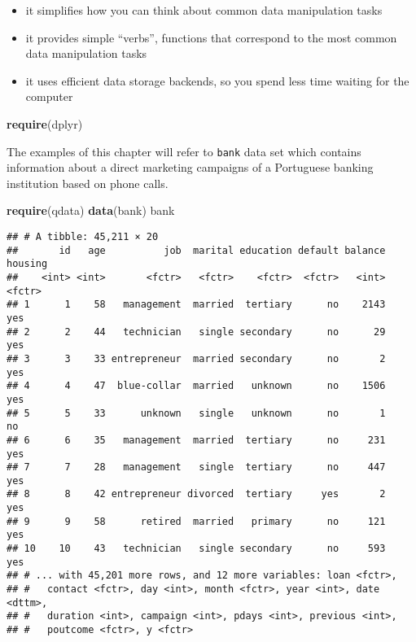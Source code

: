 \documentclass[]{book}
\newenvironment{Shaded}{\begin{snugshade}}{\end{snugshade}}
\newcommand{\KeywordTok}[1]{\textcolor[rgb]{0.13,0.29,0.53}{\textbf{{#1}}}}
\newcommand{\NormalTok}[1]{{#1}}
\providecommand{\tightlist}{%
  \setlength{\itemsep}{0pt}\setlength{\parskip}{0pt}}
\def\tightlist{}
\begin{document}
\begin{itemize}
\tightlist
\item
  it simplifies how you can think about common data manipulation tasks
\item
  it provides simple ``verbs'', functions that correspond to the most
  common data manipulation tasks
\item
  it uses efficient data storage backends, so you spend less time
  waiting for the computer
\end{itemize}

\begin{Shaded}
\begin{Highlighting}[]
\KeywordTok{require}\NormalTok{(dplyr)}
\end{Highlighting}
\end{Shaded}

The examples of this chapter will refer to \texttt{bank} data set which
contains information about a direct marketing campaigns of a Portuguese
banking institution based on phone calls.

\begin{Shaded}
\begin{Highlighting}[]
\KeywordTok{require}\NormalTok{(qdata)}
\KeywordTok{data}\NormalTok{(bank) }
\NormalTok{bank}
\end{Highlighting}
\end{Shaded}

\begin{verbatim}
## # A tibble: 45,211 × 20
##       id   age          job  marital education default balance housing
##    <int> <int>       <fctr>   <fctr>    <fctr>  <fctr>   <int>  <fctr>
## 1      1    58   management  married  tertiary      no    2143     yes
## 2      2    44   technician   single secondary      no      29     yes
## 3      3    33 entrepreneur  married secondary      no       2     yes
## 4      4    47  blue-collar  married   unknown      no    1506     yes
## 5      5    33      unknown   single   unknown      no       1      no
## 6      6    35   management  married  tertiary      no     231     yes
## 7      7    28   management   single  tertiary      no     447     yes
## 8      8    42 entrepreneur divorced  tertiary     yes       2     yes
## 9      9    58      retired  married   primary      no     121     yes
## 10    10    43   technician   single secondary      no     593     yes
## # ... with 45,201 more rows, and 12 more variables: loan <fctr>,
## #   contact <fctr>, day <int>, month <fctr>, year <int>, date <dttm>,
## #   duration <int>, campaign <int>, pdays <int>, previous <int>,
## #   poutcome <fctr>, y <fctr>
\end{verbatim}
\end{document}
